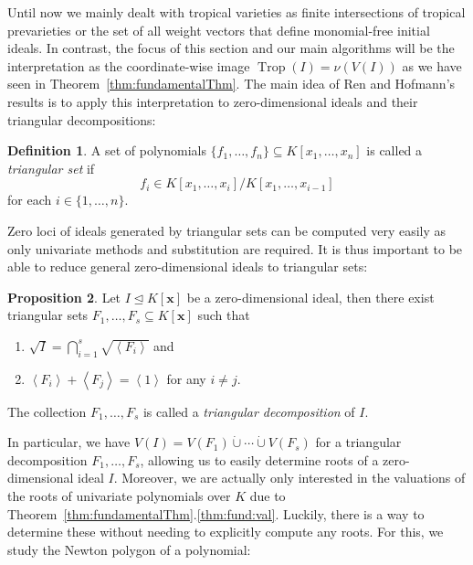 \documentclass[
  paper=a4,
  titlepage,
  bibliography=totoc,
  listof=totoc,
  pagesize=pdftex
]{scrartcl}
\numberwithin{figure}{section}
\numberwithin{equation}{section}
\numberwithin{table}{section}
\newcommand*\dotcup{\mathbin{\dot{\cup}}}
\newcommand*\ideal[1]{\left\langle #1 \right\rangle}
\let\vec\mathbf
\let\idealof\trianglelefteq
\DeclareMathOperator{\Trop}{Trop}
\theoremstyle{definition}
\newtheorem{definition}{Definition}
\newtheorem{proposition}[definition]{Proposition}
\numberwithin{definition}{section}
\begin{document}
Until now we mainly dealt with tropical varieties as finite intersections of tropical
prevarieties or the set of all weight vectors that define monomial-free initial ideals. In
contrast, the focus of this section and our main algorithms will be the interpretation as
the coordinate-wise image $\Trop(I) = \nu(V(I))$ as we have seen in
Theorem~\ref{thm:fundamentalThm}. The main idea of Ren and Hofmann's results is to apply
this interpretation to zero-dimensional ideals and their triangular decompositions:

\begin{definition}
  \label{def:triangSet}
  A set of polynomials $\{ f_1, \dots, f_n \} \subseteq K[x_1, \dots, x_n]$ is called a
  \emph{triangular set} if
  \[
    f_i \in K[x_1, \dots, x_i] / K[x_1, \dots, x_{i-1}]
  \]
  for each $i \in \{1, \dots, n\}$.
\end{definition}

Zero loci of ideals generated by triangular sets can be computed very easily as only
univariate methods and substitution are required. It is thus important to be able to
reduce general zero-dimensional ideals to triangular sets:

\begin{proposition}
  Let $I \idealof K[\vec x]$ be a zero-dimensional ideal, then there exist triangular sets
  $F_1, \dots, F_s \subseteq K[\vec x]$ such that
  \begin{enumerate}
    \item $\sqrt I = \bigcap_{i=1}^s \sqrt{\ideal{F_i}}$ and
    \item $\ideal{F_i} + \ideal{F_j} = \ideal1$ for any $i\neq j$.
  \end{enumerate}
  The collection $F_1, \dots, F_s$ is called a \emph{triangular decomposition} of $I$.
  \label{prp:triang}
\end{proposition}

In particular, we have $V(I) = V(F_1) \dotcup \cdots \dotcup V(F_s)$ for a triangular
decomposition $F_1, \dots, F_s$, allowing us to easily determine roots of a
zero-dimensional ideal $I$. Moreover, we are actually only interested in the valuations of
the roots of univariate polynomials over $K$ due to
Theorem~\ref{thm:fundamentalThm}.\ref{thm:fund:val}. Luckily, there is a way to determine
these without needing to explicitly compute any roots. For this, we study the Newton
polygon of a polynomial:
\end{document}
